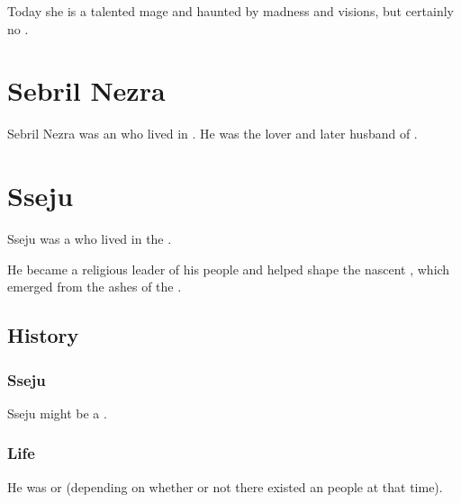 Today she is a talented mage and haunted by madness and visions, but certainly no \vertex. 















\section{Sebril Nezra}
Sebril Nezra was an \Ortaican \dax who lived in \Yormis.
He was the lover and later husband of .















\section{Sseju}
Sseju was a \scatha{} who lived in the \VaimonCaliphate. 

He became a religious leader of his people and helped shape the nascent , which emerged from the ashes of the .









\subsection{History}





\subsubsection{Sseju}
Sseju might be a \sphyle.





\subsubsection{Life}
He was  or  (depending on whether or not there existed an \quo{\Ortaican} people at that time). 

